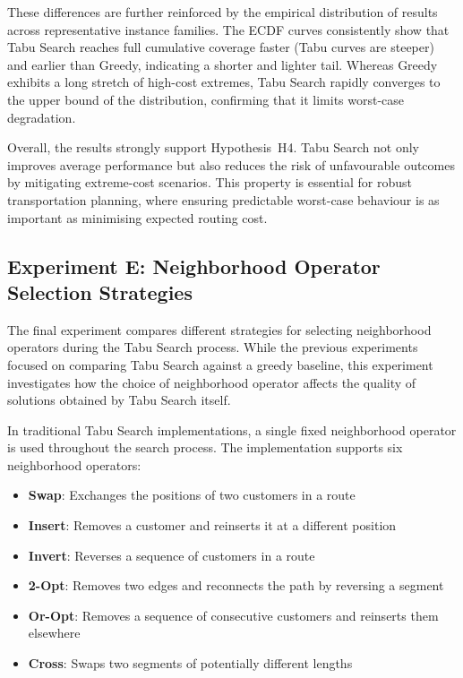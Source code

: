 These differences are further reinforced by the empirical distribution of results across representative instance families. The ECDF curves consistently show that Tabu Search reaches full cumulative coverage faster (Tabu curves are steeper) and earlier than Greedy, indicating a shorter and lighter tail. Whereas Greedy exhibits a long stretch of high-cost extremes, Tabu Search rapidly converges to the upper bound of the distribution, confirming that it limits worst-case degradation.

Overall, the results strongly support Hypothesis~H4. Tabu Search not only improves average performance but also reduces the risk of unfavourable outcomes by mitigating extreme-cost scenarios. This property is essential for robust transportation planning, where ensuring predictable worst-case behaviour is as important as minimising expected routing cost.

\subsection{Experiment E: Neighborhood Operator Selection Strategies}

The final experiment compares different strategies for selecting neighborhood operators during the Tabu Search process. While the previous experiments focused on comparing Tabu Search against a greedy baseline, this experiment investigates how the choice of neighborhood operator affects the quality of solutions obtained by Tabu Search itself.

In traditional Tabu Search implementations, a single fixed neighborhood operator is used throughout the search process. The implementation supports six neighborhood operators:
\begin{itemize}
    \item \textbf{Swap}: Exchanges the positions of two customers in a route
    \item \textbf{Insert}: Removes a customer and reinserts it at a different position
    \item \textbf{Invert}: Reverses a sequence of customers in a route
    \item \textbf{2-Opt}: Removes two edges and reconnects the path by reversing a segment
    \item \textbf{Or-Opt}: Removes a sequence of consecutive customers and reinserts them elsewhere
    \item \textbf{Cross}: Swaps two segments of potentially different lengths
\end{itemize}

